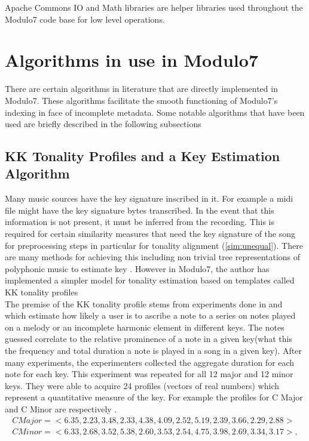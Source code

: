 \noindent Apache Commons IO and Math libraries are helper libraries used throughout the Modulo7 code base for low level operations. 

\chapter{Algorithms in use in Modulo7}

\noindent There are certain algorithms in literature that are directly implemented in Modulo7. These algorithms facilitate the smooth functioning of Modulo7's indexing in face of incomplete metadata. Some notable algorithms that have been used are briefly described in the following subsections

\section{KK Tonality Profiles and a Key Estimation Algorithm} \label{kktonality}

\noindent Many music sources have the key signature inscribed in it. For example a midi file might have the key signature bytes transcribed. In the event that this information is not present, it must be inferred from the recording. This is required for certain similarity measures that need the key signature of the song for preprocessing steps  in particular for tonality alignment (\ref{sim:unequal}). There are many methods for achieving this including non trivial tree representations of polyphonic music to estimate key \cite{treemodel}. However in Modulo7, the author has implemented a simpler model for tonality estimation based on templates called KK tonality profiles \cite{kkTonalityKeyFinding} \\

\noindent The premise of the KK tonality profile stems from experiments done in \cite{kkTonalityKeyFinding} and \cite{kkcognitive} which estimate how likely a user is to ascribe a note to a series on notes played on a melody or an incomplete harmonic element in different keys. The notes guessed correlate to the relative prominence of a note in a given key(what this the frequency and total duration a note is played in a song in a given key). After many experiments, the experimenters collected the aggregate duration for each note for each key. This experiment was  repeated for all 12 major and 12 minor keys. They were able to acquire 24 profiles (vectors of real numbers) which represent a quantitative measure of the key. For example the profiles for C Major and C Minor are respectively \cite{kkcognitive}.
\begin{equation} \label{kkprofiles}
\begin{aligned}
  CMajor = <6.35, 2.23, 3.48, 2.33, 4.38, 4.09, 2.52, 5.19, 2.39, 3.66, 2.29, 2.88> \\
  CMinor = <6.33, 2.68, 3.52, 5.38, 2.60, 3.53, 2.54, 4.75, 3.98, 2.69, 3.34, 3.17>, 
\end{aligned}
\end{equation}

